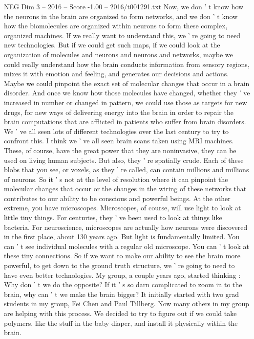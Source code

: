 \begin{textsample}{NEG Dim 3 – 2016 – Score -1.00 – 2016/t001291.txt}
Now, we don ' t know how the neurons in the brain are organized to form networks, and we don ' t know how the biomolecules are organized within neurons to form these complex, organized machines.
If we really want to understand this, we ' re going to need new technologies.
But if we could get such maps, if we could look at the organization of molecules and neurons and neurons and networks, maybe we could really understand how the brain conducts information from sensory regions, mixes it with emotion and feeling, and generates our decisions and actions.
Maybe we could pinpoint the exact set of molecular changes that occur in a brain disorder.
And once we know how those molecules have changed, whether they ' ve increased in number or changed in pattern, we could use those as targets for new drugs, for new ways of delivering energy into the brain in order to repair the brain computations that are afflicted in patients who suffer from brain disorders.
We ' ve all seen lots of different technologies over the last century to try to confront this.
I think we ' ve all seen brain scans taken using MRI machines.
These, of course, have the great power that they are noninvasive, they can be used on living human subjects.
But also, they ' re spatially crude.
Each of these blobs that you see, or voxels, as they ' re called, can contain millions and millions of neurons.
So it ' s not at the level of resolution where it can pinpoint the molecular changes that occur or the changes in the wiring of these networks that contributes to our ability to be conscious and powerful beings.
At the other extreme, you have microscopes.
Microscopes, of course, will use light to look at little tiny things.
For centuries, they ' ve been used to look at things like bacteria.
For neuroscience, microscopes are actually how neurons were discovered in the first place, about 130 years ago.
But light is fundamentally limited.
You can ' t see individual molecules with a regular old microscope.
You can ' t look at these tiny connections.
So if we want to make our ability to see the brain more powerful, to get down to the ground truth structure, we ' re going to need to have even better technologies.
My group, a couple years ago, started thinking : Why don ' t we do the opposite?
If it ' s so darn complicated to zoom in to the brain, why can ' t we make the brain bigger?
It initially started with two grad students in my group, Fei Chen and Paul Tillberg.
Now many others in my group are helping with this process.
We decided to try to figure out if we could take polymers, like the stuff in the baby diaper, and install it physically within the brain.

\end{textsample}
